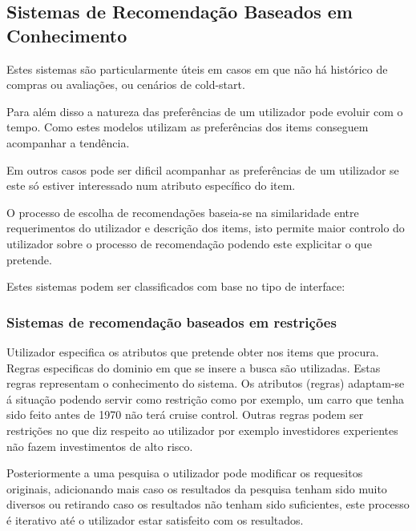 \subsection{Sistemas de Recomendação Baseados em Conhecimento}
\hfill
\par Estes sistemas são particularmente úteis em casos em que não há histórico de compras ou avaliações, ou cenários de cold-start.
\par Para além disso a natureza das preferências de um utilizador pode evoluir com o tempo. Como estes modelos utilizam as preferências dos items conseguem acompanhar a tendência. 
\par Em outros casos pode ser dificil acompanhar as preferências de um utilizador se este só estiver interessado num atributo específico do item.
\par O processo de escolha de recomendações baseia-se na similaridade entre requerimentos do utilizador e descrição dos items, isto permite maior controlo do utilizador sobre o processo de recomendação podendo este explicitar o que pretende.
\par Estes sistemas podem ser classificados com base no tipo de interface:
\hfill
\subsubsection{Sistemas de recomendação baseados em restrições}
\hfill
 \par Utilizador especifica os atributos que pretende obter nos items que procura. Regras especificas do dominio em que se insere a busca são utilizadas. Estas regras representam o conhecimento do sistema. Os atributos (regras) adaptam-se á situação podendo servir como restrição como por exemplo, um carro que tenha sido feito  antes de 1970 não terá cruise control. Outras regras podem ser restrições no que diz respeito ao utilizador por exemplo investidores experientes não fazem investimentos de alto risco. 
 \par Posteriormente a uma pesquisa o utilizador pode modificar os requesitos originais, adicionando mais caso os resultados da pesquisa tenham sido muito diversos ou retirando caso os resultados não tenham sido suficientes, este processo é iterativo até o utilizador estar satisfeito com os resultados.  

\hfill
